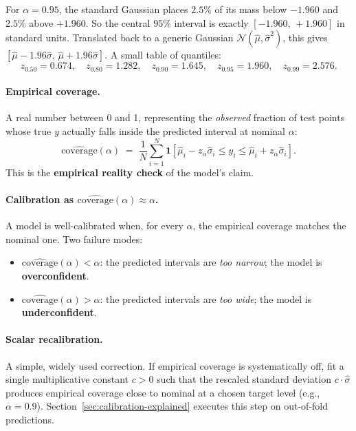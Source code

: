 \documentclass[11pt,a4paper]{article}
\begin{document}
\begin{recapbox}
For $\alpha = 0.95$, the standard Gaussian places $2.5\%$ of its mass below $-1.960$ and $2.5\%$ above $+1.960$. So the central $95\%$ interval is exactly $[-1.960,\, +1.960]$ in standard units. Translated back to a generic Gaussian $\mathcal{N}(\hat\mu, \hat\sigma^2)$, this gives $[\hat\mu - 1.96\hat\sigma,\, \hat\mu + 1.96\hat\sigma]$. A small table of quantiles:
\[
z_{0.50} = 0.674, \quad z_{0.80} = 1.282, \quad z_{0.90} = 1.645, \quad z_{0.95} = 1.960, \quad z_{0.99} = 2.576.
\]
\end{recapbox}

\paragraph{Empirical coverage.} A real number between 0 and 1, representing the \emph{observed} fraction of test points whose true $y$ actually falls inside the predicted interval at nominal $\alpha$:
\[
\widehat{\text{coverage}}(\alpha) \;=\; \frac{1}{N}\sum_{i=1}^N \mathbf{1}\!\left[\hat\mu_i - z_\alpha \hat\sigma_i \leq y_i \leq \hat\mu_i + z_\alpha \hat\sigma_i\right].
\]
This is the \textbf{empirical reality check} of the model's claim.

\paragraph{Calibration as $\widehat{\text{coverage}}(\alpha) \approx \alpha$.} A model is well-calibrated when, for every $\alpha$, the empirical coverage matches the nominal one. Two failure modes:
\begin{itemize}
    \item $\widehat{\text{coverage}}(\alpha) < \alpha$: the predicted intervals are \emph{too narrow}; the model is \textbf{overconfident}.
    \item $\widehat{\text{coverage}}(\alpha) > \alpha$: the predicted intervals are \emph{too wide}; the model is \textbf{underconfident}.
\end{itemize}

\paragraph{Scalar recalibration.} A simple, widely used correction. If empirical coverage is systematically off, fit a single multiplicative constant $c > 0$ such that the rescaled standard deviation $c \cdot \hat\sigma$ produces empirical coverage close to nominal at a chosen target level (e.g., $\alpha = 0.9$). Section~\ref{sec:calibration-explained} executes this step on out-of-fold predictions.
\end{document}
